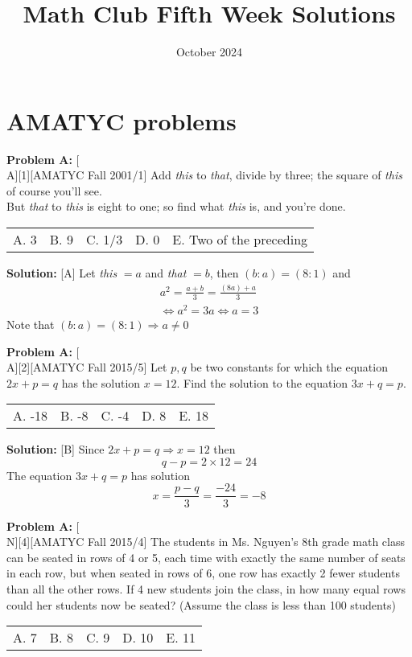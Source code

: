 \documentclass[12pt]{article}
\title{Math Club Fifth Week Solutions}
\date{October 2024}
\makeatletter
\newcounter{problem}
\newenvironment{problem}[1]{%
    \stepcounter{problem}
    \noindent\textbf{Problem A\theproblem:} #1
    \\[1em]
}{}
\newcommand{\multChoice}[5]{%
    \begin{tabular}{l @{\hskip 1.5cm} l @{\hskip 1.5cm} l @{\hskip 1.5cm} l @{\hskip 1.5cm} l}
    A. #1 & B. #2 & C. #3 & D. #4 & E. #5
    \end{tabular}
}
\newenvironment{solution}{%
    \vspace{1em}
    \noindent\textbf{Solution:} 
}{}
\makeatother
\begin{document}
\sloppy
\maketitle

\section*{AMATYC problems}

\begin{problem}[A][1][AMATYC Fall 2001/1]
    Add \textit{this} to \textit{that}, divide by three; the square of \textit{this} of course you'll see. \\
    But \textit{that} to \textit{this} is eight to one; so find what \textit{this} is, and you're done.
\end{problem}
\multChoice{3}{9}{1/3}{0}{Two of the preceding}

\begin{solution}[A]
    Let \textit{this} $=a$ and \textit{that} $=b$, then $(b:a)=(8:1)$ and
    \begin{align*}
        a^2=\frac{a+b}{3}=\frac{(8a)+a}{3} \\
        \iff a^2 = 3a \iff a=3
    \end{align*}
    Note that $(b:a)=(8:1) \Rightarrow a \neq 0$
\end{solution}

\begin{problem}[A][2][AMATYC Fall 2015/5]
    Let $p,q$ be two constants for which the equation $2x + p = q$ has the solution $x = 12$. Find the solution to the equation $3x + q = p$.
\end{problem}
 \multChoice{-18}{-8}{-4}{8}{18}

\begin{solution}[B]
    Since $2x+p=q \Rightarrow x=12$ then
    $$q-p = 2 \times 12 = 24$$
    The equation $3x+q=p$ has solution
    $$x = \frac{p-q}{3} = \frac{-24}{3}=-8$$
\end{solution}

\begin{problem}[N][4][AMATYC Fall 2015/4]
    The students in Ms. Nguyen's 8th grade math class can be seated in rows of 4 or 5, each time with exactly the same number of seats in each row, but when seated in rows of 6, one row has exactly 2 fewer students than all the other rows. If 4 new students join the class, in how many equal rows could her students now be seated? (Assume the class is less than 100 students)
\end{problem}
\multChoice{7}{8}{9}{10}{11}
\end{document}
